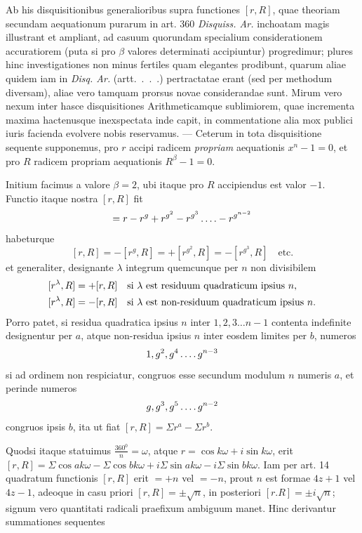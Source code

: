 Ab his disquisitionibus generalioribus supra functiones $[r,R]$, quae theoriam secundam aequationum purarum in art. 360 \emph{Disquiss. Ar.} inchoatam magis illustrant et ampliant, ad casuum quorundam specialium considerationem accuratiorem (puta si pro $\beta$ valores determinati accipiuntur) progredimur; plures hinc investigationes non minus fertiles quam elegantes prodibunt, quarum aliae quidem iam in \emph{Disq. Ar.} (artt.\ .\ .\ .) pertractatae erant (sed per methodum diversam), aliae vero tamquam prorsus novae considerandae sunt. Mirum vero nexum inter hasce disquisitiones Arithmeticamque sublimiorem, quae incrementa maxima hactenusque inexspectata inde capit, in commentatione alia mox publici iuris facienda evolvere nobis reservamus. — Ceterum in tota disquisitione sequente supponemus, pro $r$ accipi radicem \emph{propriam} aequationis $x^n-1=0$, et pro $R$ radicem propriam aequationis $R^\beta-1=0$.

Initium facimus a valore $\beta=2$, ubi itaque pro $R$ accipiendus est valor $-1$. Functio itaque nostra $[r,R]$ fit
\[
=r-r^g+r^{g^2}-r^{g^3}\mathinner{.\,.\,.\,.}-r^{g^{n-2}}
\]
habeturque
\[
[r,R]=-[r^g,R]=+[r^{g^2},R]=-[r^{g^3},R]\quad\text{etc.}
\]
et generaliter, designante $\lambda$ integrum quemcunque per $n$ non divisibilem
%
\[
\begin{aligned}
[r^\lambda,R]&=+[r,R]\quad\text{si }\lambda\text{ est residuum quadraticum ipsius }n,\\
\relax[r^\lambda,R]&=-[r,R]\quad\text{si }\lambda\text{ est non-residuum quadraticum ipsius }n.
\end{aligned}
\]
Porro patet, si residua quadratica ipsius $n$ inter $1,2,3\dots n-1$ contenta indefinite designentur per $a$, atque non-residua ipsius $n$ inter eosdem limites per $b$, numeros
\[
1,g^2,g^4\mathinner{.\,.\,.\,.} g^{n-3}
\]
si ad ordinem non respiciatur, congruos esse secundum modulum $n$ numeris $a$, et perinde numeros
\[
g,g^3,g^5\mathinner{.\,.\,.\,.} g^{n-2}
\]
congruos ipsis $b$, ita ut fiat $[r,R]=\Sigma r^a-\Sigma r^b$.

Quodsi itaque statuimus $\frac{360^0}n=\omega$, atque $r=\cos k\omega+i\sin k\omega$, erit $[r,R]=\Sigma\cos ak\omega-\Sigma\cos bk\omega+i\Sigma\sin ak\omega-i\Sigma\sin bk\omega$. Iam per art. 14 quadratum functionis $[r,R]$ erit $=+n$ vel $=-n$, prout $n$ est formae $4z+1$ vel $4z-1$, adeoque in casu priori $[r,R]=\pm\surd n$, in posteriori $[r.R]=\pm i\surd n$; signum vero quantitati radicali praefixum ambiguum manet. Hinc derivantur summationes sequentes


